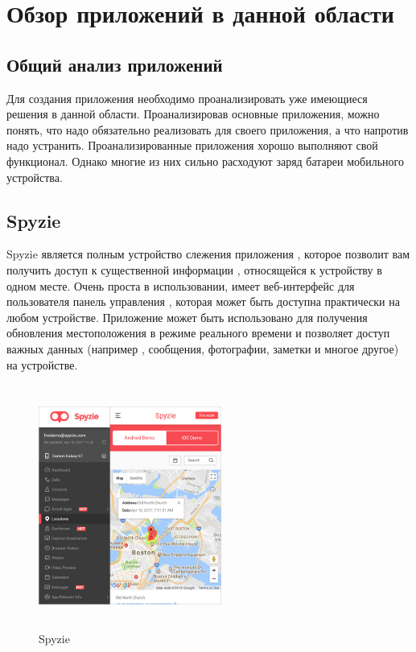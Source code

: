 \documentclass[a4paper,12pt]{article}
\begin{document}

\pagebreak


\section{Обзор приложений в данной области}
\subsection{Общий анализ приложений}
Для создания приложения необходимо проанализировать уже имеющиеся решения
в данной области. Проанализировав основные приложения, можно понять, что
надо обязательно реализовать для своего приложения, а что напротив надо
устранить.
Проанализированные приложения хорошо выполняют свой функционал. Однако многие
из них сильно расходуют заряд батареи мобильного устройства.
\subsection{Spyzie}

Spyzie является полным устройство слежения приложения ,
 которое позволит вам получить доступ к существенной информации , 
 относящейся к устройству в одном месте. Очень проста в использовании, 
 имеет веб-интерфейс для пользователя панель управления , которая может быть 
 доступна практически на любом устройстве. Приложение может быть использовано для 
 получения обновления местоположения в режиме реального времени и 
 позволяет доступ важных данных (например , сообщения, фотографии, заметки и многое другое) на устройстве\cite{review5}.
 \begin{figure}[H]
 	\centering
 	\includegraphics[width=6cm,height=8cm]{images/spy-location.jpg}
 	\caption{Spyzie}
 	\label{fig:card}
 \end{figure}
\end{document}
